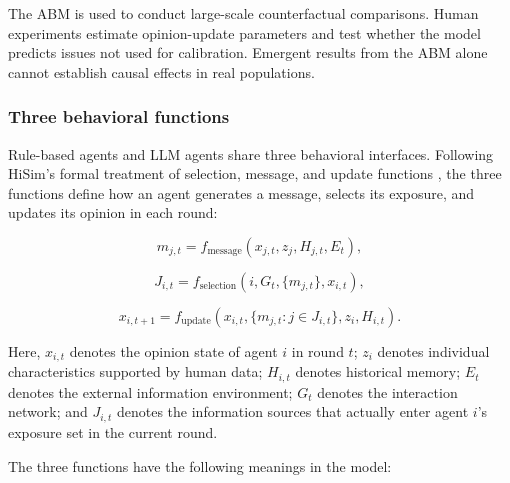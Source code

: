 \documentclass[11pt,a4paper]{article}
\begin{document}
The ABM is used to conduct large-scale counterfactual comparisons. Human experiments estimate opinion-update parameters and test whether the model predicts issues not used for calibration. Emergent results from the ABM alone cannot establish causal effects in real populations.

\subsubsection{Three behavioral functions}

Rule-based agents and LLM agents share three behavioral interfaces. Following HiSim's formal treatment of selection, message, and update functions \cite{mou2024}, the three functions define how an agent generates a message, selects its exposure, and updates its opinion in each round:

\begin{equation*}
m_{j,t}=f_{\text{message}}(x_{j,t},z_j,H_{j,t},E_t),
\end{equation*}

\begin{equation*}
J_{i,t}=f_{\text{selection}}(i,G_t,\{m_{j,t}\},x_{i,t}),
\end{equation*}

\begin{equation*}
x_{i,t+1}=f_{\text{update}}
\left(x_{i,t},\{m_{j,t}:j\in J_{i,t}\},z_i,H_{i,t}\right).
\end{equation*}

Here, $x_{i,t}$ denotes the opinion state of agent $i$ in round $t$; $z_i$ denotes individual characteristics supported by human data; $H_{i,t}$ denotes historical memory; $E_t$ denotes the external information environment; $G_t$ denotes the interaction network; and $J_{i,t}$ denotes the information sources that actually enter agent $i$'s exposure set in the current round.

The three functions have the following meanings in the model:
\end{document}
